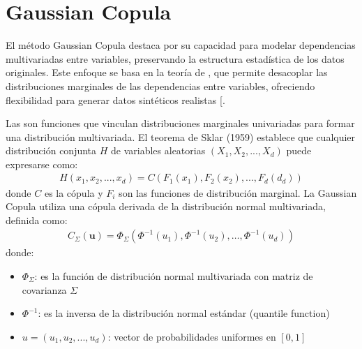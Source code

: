 \documentclass[a4paper,10pt,spanish]{jupyterBook}
\begin{document}
\sphinxstepscope


\section{Gaussian Copula}
\label{\detokenize{content/02/GaussianCopula:gaussian-copula}}\label{\detokenize{content/02/GaussianCopula::doc}}
\sphinxAtStartPar
El método Gaussian Copula destaca por su capacidad para modelar dependencias multivariadas entre variables, preservando la estructura estadística de los datos originales. Este enfoque se basa en la teoría de , que permite desacoplar las distribuciones marginales de las dependencias entre variables, ofreciendo flexibilidad para generar datos sintéticos realistas {[}\sphinxhref{https://arxiv.org/pdf/2009.09471}{Zheng et al., 2020}{]}.

\sphinxAtStartPar
Las  son funciones que vinculan distribuciones marginales univariadas para formar una distribución multivariada. El teorema de Sklar (1959) establece que cualquier distribución conjunta \(H\) de variables aleatorias \((X_1,X_2,...,X_d)\) puede expresarse como:
\begin{equation*}
\begin{split}H(x_1,x_2,...,x_d)=C(F_1(x_1),F_2(x_2),...,F_d(d_d))\end{split}
\end{equation*}
\sphinxAtStartPar
donde \(C\) es la cópula y \(F_i\) son las funciones de distribución marginal. La Gaussian Copula utiliza una cópula derivada de la distribución normal multivariada, definida como:
\begin{equation*}
\begin{split}
C_\Sigma(\mathbf{u}) = \Phi_\Sigma \left( \Phi^{-1}(u_1), \Phi^{-1}(u_2), \dots, \Phi^{-1}(u_d) \right)
\end{split}
\end{equation*}
\sphinxAtStartPar
donde:
\begin{itemize}
\item {}
\sphinxAtStartPar
\(\Phi_\Sigma\): es la función de distribución normal multivariada con matriz de covarianza \(\Sigma\)

\item {}
\sphinxAtStartPar
\(\Phi^{-1}\): es la inversa de la distribución normal estándar (quantile function)

\item {}
\sphinxAtStartPar
\(u=(u_1,u_2,...,u_d)\): vector de probabilidades uniformes en \([0,1]\)

\end{itemize}
\end{document}
